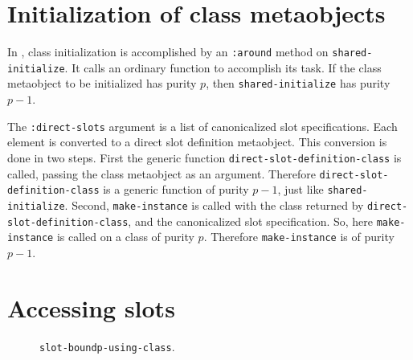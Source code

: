 \section{Initialization of class metaobjects}

In \sysname{}, class initialization is accomplished by an
\texttt{:around} method on \texttt{shared-initialize}.  It calls an
ordinary function to accomplish its task.  If the class metaobject to
be initialized has purity $p$, then \texttt{shared-initialize} has
purity $p-1$.

The \texttt{:direct-slots} argument is a list of canonicalized slot
specifications.  Each element is converted to a direct slot definition
metaobject.  This conversion is done in two steps.  First the generic
function \texttt{direct-slot-definition-class} is called, passing the
class metaobject as an argument.  Therefore
\texttt{direct-slot-definition-class} is a generic function of purity
$p-1$, just like \texttt{shared-initialize}.  Second,
\texttt{make-instance} is called with the class returned by
\texttt{direct-slot-definition-class}, and the canonicalized
slot specification.  So, here \texttt{make-instance} is called on a
class of purity $p$.  Therefore \texttt{make-instance} is of purity
$p-1$.

\section{Accessing slots}



\begin{figure}
\begin{center}
\end{center}
\caption{\label{fig-slot-boundp-using-class}
\texttt{slot-boundp-using-class}.}
\end{figure}

